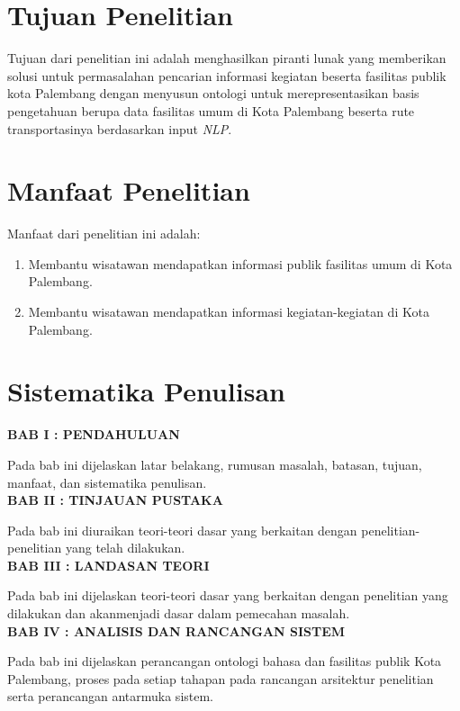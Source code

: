 \section{Tujuan Penelitian}
Tujuan dari penelitian ini adalah menghasilkan piranti lunak yang memberikan solusi untuk permasalahan pencarian informasi kegiatan beserta fasilitas publik kota Palembang dengan menyusun ontologi untuk merepresentasikan basis pengetahuan berupa data fasilitas umum di Kota Palembang beserta rute transportasinya berdasarkan input \emph{NLP}.


\section{Manfaat Penelitian}
Manfaat dari penelitian ini adalah:
\begin{enumerate}
  \item Membantu wisatawan mendapatkan informasi publik fasilitas umum di Kota Palembang.
  \item Membantu wisatawan mendapatkan informasi kegiatan-kegiatan di Kota Palembang.
\end{enumerate}

\section{Sistematika Penulisan}
\noindent
\textbf{BAB I : PENDAHULUAN}

Pada bab ini dijelaskan latar belakang, rumusan masalah, batasan, tujuan, manfaat, dan sistematika penulisan.\\

\noindent
\textbf{BAB II : TINJAUAN PUSTAKA}

Pada bab ini diuraikan teori-teori dasar yang berkaitan dengan penelitian-penelitian yang telah dilakukan.\\

\noindent
\textbf{BAB III : LANDASAN TEORI}

Pada bab ini dijelaskan teori-teori dasar yang berkaitan dengan penelitian yang dilakukan dan akanmenjadi dasar dalam pemecahan masalah.\\

\noindent
\textbf{BAB IV : ANALISIS DAN RANCANGAN SISTEM}

Pada bab ini dijelaskan perancangan ontologi bahasa dan fasilitas publik Kota Palembang, proses pada setiap tahapan pada rancangan arsitektur penelitian serta perancangan antarmuka sistem.\\

